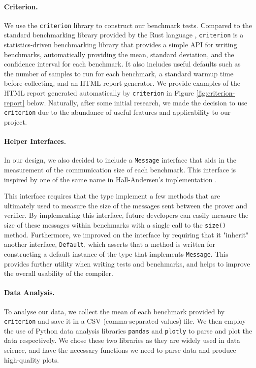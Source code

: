 \paragraph{Criterion.} We use the \texttt{criterion} library \cite{criterion} to construct our 
benchmark tests. Compared to the standard benchmarking library provided by the Rust language \cite{cargo-bench},
\texttt{criterion} is a statistics-driven benchmarking library that provides a simple API for writing benchmarks, 
automatically providing the mean, standard deviation, and the confidence interval for each benchmark. 
It also includes useful defaults such as the number of samples to run for each benchmark, a standard 
warmup time before collecting, and an HTML report generator. We provide examples of 
the HTML report generated automatically by \texttt{criterion} in Figure 
\ref{fig:criterion-report} below. 
Naturally, after some initial research, we made the decision to use \texttt{criterion}
due to the abundance of useful features and applicability to our project. 

\paragraph{Helper Interfaces.} In our design, we also decided 
to include a \texttt{Message} interface that aids in the measurement of the 
communication size of each benchmark. This interface is inspired by one of 
the same name in Hall-Andersen's implementation \cite{MHAStackSig}. 

This interface requires that the type implement a few methods that are ultimately
used to measure the size of the messages sent between the prover and verifier. 
By implementing this interface, future developers can easily measure the size 
of these messages within benchmarks with a single call to the \texttt{size()} method. 
Furthermore, we improved on the interface by requiring that it "inherit" another interface, 
\texttt{Default}, which asserts that a method is written for constructing
a default instance of the type that implements \texttt{Message}. This provides 
further utility when writing tests and benchmarks, and helps to improve the 
overall usability of the compiler.

\paragraph{Data Analysis.} To analyse our data, we collect the mean 
of each benchmark provided by \texttt{criterion} \cite{criterion} and save it in a 
CSV (comma-separated values) file. We then employ the use of Python data analysis libraries 
\texttt{pandas} \cite{reback2020pandas,mckinney-proc-scipy-2010} 
and \texttt{plotly} \cite{plotly} to parse and plot the data 
respectively. We chose these two libraries as they are widely used in data science, 
and have the necessary functions we need to parse data and produce high-quality plots.


